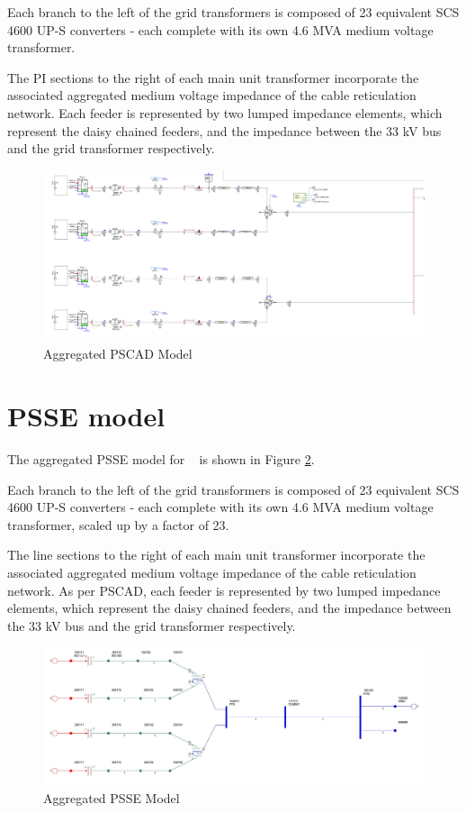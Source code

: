 \documentclass{../grid-link-report}
\begin{document}
	Each branch to the left of the grid transformers is composed of 23 equivalent SCS 4600 UP-S converters - each complete with its own 4.6 MVA medium voltage transformer. 
	
	The PI sections to the right of each main unit transformer incorporate the associated aggregated medium voltage impedance of the cable reticulation network. Each feeder is represented by two lumped impedance elements, which represent the daisy chained feeders, and the impedance between the 33 kV bus and the grid transformer respectively.

	
	\begin{figure}[H]
		\centering
		\includegraphics[width=1.0\textwidth]{report-assets/images/pscad-model-screenshot.png}
		\caption{Aggregated PSCAD Model}
		\label{fig:pscad_model}
	\end{figure}	
	
	\section{PSSE model}
	The aggregated PSSE model for \project ~ is shown in Figure \ref{fig:psse_model}. 
	
	Each branch to the left of the grid transformers is composed of 23 equivalent SCS 4600 UP-S converters - each complete with its own 4.6 MVA medium voltage transformer, scaled up by a factor of 23.
	
	The line sections to the right of each main unit transformer incorporate the associated aggregated medium voltage impedance of the cable reticulation network. As per PSCAD, each feeder is represented by two lumped impedance elements, which represent the daisy chained feeders, and the impedance between the 33 kV bus and the grid transformer respectively.
	
	\begin{figure}[H]
		\centering
		\includegraphics[width=1\textwidth]{report-assets/images/psse-screenshot.jpg}
		\caption{Aggregated PSSE Model}
		\label{fig:psse_model}
	\end{figure}
	
\end{document}
